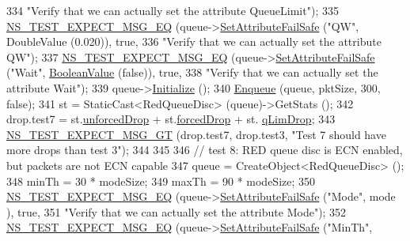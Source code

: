 \begin{DoxyCode}
334                          \textcolor{stringliteral}{"Verify that we can actually set the attribute QueueLimit"});
335   \hyperlink{group__testing_ga7304ba46a28d8cf08dfdfd6499cf7068}{NS\_TEST\_EXPECT\_MSG\_EQ} (queue->\hyperlink{classns3_1_1ObjectBase_aa7d333004e970f925a4ed5df275541b5}{SetAttributeFailSafe} (\textcolor{stringliteral}{"QW"}, 
      DoubleValue (0.020)), \textcolor{keyword}{true},
336                          \textcolor{stringliteral}{"Verify that we can actually set the attribute QW"});
337   \hyperlink{group__testing_ga7304ba46a28d8cf08dfdfd6499cf7068}{NS\_TEST\_EXPECT\_MSG\_EQ} (queue->\hyperlink{classns3_1_1ObjectBase_aa7d333004e970f925a4ed5df275541b5}{SetAttributeFailSafe} (\textcolor{stringliteral}{"Wait"}, 
      \hyperlink{classns3_1_1BooleanValue}{BooleanValue} (\textcolor{keyword}{false})), \textcolor{keyword}{true},
338                          \textcolor{stringliteral}{"Verify that we can actually set the attribute Wait"});
339   queue->\hyperlink{classns3_1_1Object_af4411cb29971772fcd09203474a95078}{Initialize} ();
340   \hyperlink{classRedQueueDiscTestCase_a231b433374e4485d83bcca3088685e31}{Enqueue} (queue, pktSize, 300, \textcolor{keyword}{false});
341   st = StaticCast<RedQueueDisc> (queue)->GetStats ();
342   drop.test7 = st.\hyperlink{structns3_1_1RedQueueDisc_1_1Stats_a242027f6eb7d30e2cd636c52080e2c73}{unforcedDrop} + st.\hyperlink{structns3_1_1RedQueueDisc_1_1Stats_a56951fa215564c8d2e59aa046dc3e494}{forcedDrop} + st.
      \hyperlink{structns3_1_1RedQueueDisc_1_1Stats_a2374b8b8386ad6e42435bf1b29109bad}{qLimDrop};
343   \hyperlink{group__testing_ga6ba43672d44c1e85acfb1daf2af66612}{NS\_TEST\_EXPECT\_MSG\_GT} (drop.test7, drop.test3, \textcolor{stringliteral}{"Test 7 should have more drops than
       test 3"});
344 
345 
346   \textcolor{comment}{// test 8: RED queue disc is ECN enabled, but packets are not ECN capable}
347   queue = CreateObject<RedQueueDisc> ();
348   minTh = 30 * modeSize;
349   maxTh = 90 * modeSize;
350   \hyperlink{group__testing_ga7304ba46a28d8cf08dfdfd6499cf7068}{NS\_TEST\_EXPECT\_MSG\_EQ} (queue->\hyperlink{classns3_1_1ObjectBase_aa7d333004e970f925a4ed5df275541b5}{SetAttributeFailSafe} (\textcolor{stringliteral}{"Mode"}, mode
      ), \textcolor{keyword}{true},
351                          \textcolor{stringliteral}{"Verify that we can actually set the attribute Mode"});
352   \hyperlink{group__testing_ga7304ba46a28d8cf08dfdfd6499cf7068}{NS\_TEST\_EXPECT\_MSG\_EQ} (queue->\hyperlink{classns3_1_1ObjectBase_aa7d333004e970f925a4ed5df275541b5}{SetAttributeFailSafe} (\textcolor{stringliteral}{"MinTh"}, 

\end{DoxyCode}
